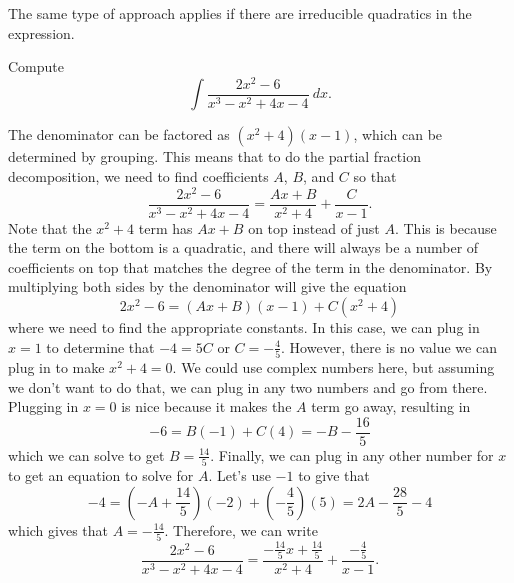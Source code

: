 \documentclass{ximera}
\begin{document}
The same type of approach applies if there are irreducible quadratics in the expression.

\begin{example}
    Compute
    \begin{equation*}
        \int \frac{2x^2 - 6}{x^3 - x^2 + 4x - 4}\ dx.
    \end{equation*}
\end{example}

\begin{exampleSol}
    The denominator can be factored as $(x^2 + 4)(x-1)$, which can be determined by grouping. This means that to do the partial fraction decomposition, we need to find coefficients $A$, $B$, and $C$ so that
    \begin{equation*}
        \frac{2x^2 - 6}{x^3 - x^2 + 4x - 4} = \frac{Ax + B}{x^2 + 4} + \frac{C}{x-1}.
    \end{equation*}
    Note that the $x^2 + 4$ term has $Ax + B$ on top instead of just $A$. This is because the term on the bottom is a quadratic, and there will always be a number of coefficients on top that matches the degree of the term in the denominator. By multiplying both sides by the denominator will give the equation
    \begin{equation*}
        2x^2 - 6 = (Ax + B)(x-1) + C(x^2 + 4)
    \end{equation*}
    where we need to find the appropriate constants. In this case, we can plug in $x=1$ to determine that $-4 = 5C$ or $C = -\frac{4}{5}$. However, there is no value we can plug in to make $x^2 + 4 = 0$. We could use complex numbers here, but assuming we don't want to do that, we can plug in any two numbers and go from there. Plugging in $x=0$ is nice because it makes the $A$ term go away, resulting in
    \begin{equation*}
        -6 = B(-1) + C(4) = -B - \frac{16}{5}
    \end{equation*}
    which we can solve to get $B = \frac{14}{5}$. Finally, we can plug in any other number for $x$ to get an equation to solve for $A$. Let's use $-1$ to give that
    \begin{equation*}
        -4 = \left(-A + \frac{14}{5}\right)(-2) + \left(-\frac{4}{5}\right)(5) = 2A - \frac{28}{5} - 4
    \end{equation*}
    which gives that $A = -\frac{14}{5}$. Therefore, we can write 
    \begin{equation*}
        \frac{2x^2 - 6}{x^3 - x^2 + 4x - 4} = \frac{-\frac{14}{5}x + \frac{14}{5}}{x^2 + 4} + \frac{-\frac{4}{5}}{x-1}.

\end{equation*}
\end{exampleSol}
\end{document}
